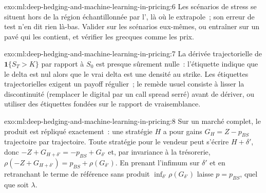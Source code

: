 \begin{solution}{exo:ml:deep-hedging-and-machine-learning-in-pricing:6}
Les scénarios de stress se situent hors de la région échantillonnée par l', là où le  extrapole~; son erreur de test n'en dit rien
là-bas. Valider sur les scénarios eux-mêmes, ou entraîner sur un pavé qui les contient, et vérifier les grecques comme les prix.
\end{solution}

\begin{solution}{exo:ml:deep-hedging-and-machine-learning-in-pricing:7}
La dérivée trajectorielle de $\mathbf1\{S_T > K\}$ par rapport à $S_0$ est presque sûrement nulle~: l'étiquette indique que le delta est nul
alors que le vrai delta est une densité au strike. Les étiquettes trajectorielles exigent un payoff régulier~; le remède usuel consiste à lisser la
discontinuité (remplacer le digital par un call spread serré) avant de dériver, ou utiliser des étiquettes fondées sur le rapport de vraisemblance.
\end{solution}

\begin{solution}{exo:ml:deep-hedging-and-machine-learning-in-pricing:8}
Sur un marché complet, le produit est répliqué exactement~: une stratégie $H$ a pour gains $G_H = Z - p_{BS}$ trajectoire par trajectoire. Toute stratégie
pour le vendeur peut s'écrire $H + \delta'$, donc $-Z + G_{H + \delta'} = -p_{BS} + G_{\delta'}$ et, par invariance à la trésorerie,
$\rho(-Z + G_{H+\delta'}) = p_{BS} + \rho(G_{\delta'})$. En prenant l'infimum sur $\delta'$ et en retranchant le terme de référence sans produit
$\inf_{\delta'}\rho(G_{\delta'})$ laisse $p = p_{BS}$, quel que soit $\lambda$.
\end{solution}

